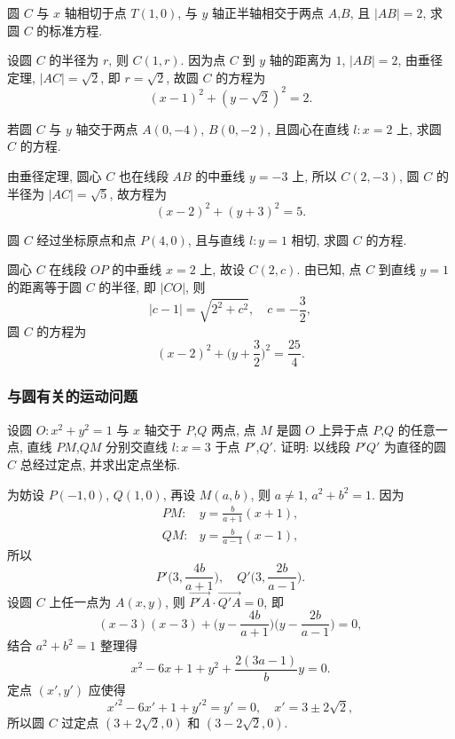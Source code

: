 \begin{example}
    圆 $C$ 与 $x$ 轴相切于点 $T(1,0)$, 与 $y$ 轴正半轴相交于两点 $A$,$B$, 且 $|AB|=2$, 求圆 $C$ 的标准方程.
\end{example}
\beginsolution
    设圆 $C$ 的半径为 $r$, 则 $C(1,r)$. 因为点 $C$ 到 $y$ 轴的距离为 $1$, $|AB|=2$, 由垂径定理, $|AC|= \sqrt2$, 即 $r=\sqrt2$, 故圆 $C$ 的方程为
    \[(x-1)^2+ (y-\sqrt2)^2= 2.\]
\endsolution

\lianxi
\begin{exercise}
    若圆 $C$ 与 $y$ 轴交于两点 $A(0, -4)$, $B(0,-2)$, 且圆心在直线 $l\colon x=2$ 上, 求圆 $C$ 的方程. 
\end{exercise}
\beginsolution
    由垂径定理, 圆心 $C$ 也在线段 $AB$ 的中垂线 $y=-3$ 上, 所以 $C(2,-3)$, 圆 $C$ 的半径为 $|AC|=\sqrt5$, 故方程为
    \[(x-2)^2+(y+3)^2= 5.\]
\endsolution

\begin{exercise}
    圆 $C$ 经过坐标原点和点 $P(4,0)$, 且与直线 $l\colon y=1$ 相切, 求圆 $C$ 的方程.
\end{exercise}
\beginsolution
    圆心 $C$ 在线段 $OP$ 的中垂线 $x=2$ 上, 故设 $C(2,c)$. 由已知, 点 $C$ 到直线 $y=1$ 的距离等于圆 $C$ 的半径, 即 $|CO|$, 则
    \[|c-1|= \sqrt{2^2+c^2},\quad c=-\frac32,\]
    圆 $C$ 的方程为
    \[(x-2)^2+ \biggl(y+\frac32\biggr)^2= \frac{25}4.\]
\endsolution

\subsubsection{与圆有关的运动问题}
\begin{example}
    设圆 $O\colon x^2 +y^2 =1$ 与 $x$ 轴交于 $P$,$Q$ 两点, 点 $M$ 是圆 $O$ 上异于点 $P$,$Q$ 的任意一点, 直线 $PM$,$QM$ 分别交直线 $l\colon x=3$ 于点 $P'$,$Q'$. 证明: 以线段 $P'Q'$ 为直径的圆 $C$ 总经过定点, 并求出定点坐标.
\end{example}
\beginsolution
    为妨设 $P(-1,0)$, $Q(1,0)$, 再设 $M(a,b)$, 则 $a\neq 1$, $a^2+b^2= 1$. 因为
    \[\begin{aligned}
        PM\colon &y= \frac{b}{a+1}(x+1),\\
        QM\colon &y= \frac{b}{a-1}(x-1),
    \end{aligned}\]
    所以
    \[P'\biggl(3,\frac{4b}{a+1}\biggr),\quad
    Q'\biggl(3,\frac{2b}{a-1}\biggr).\]
    设圆 $C$ 上任一点为 $A(x,y)$, 则 $\overrightarrow{P'A}\cdot \overrightarrow{Q'A}=0$, 即
    \[(x-3)(x-3)+ \biggl(y-\frac{4b}{a+1}\biggr)\biggl(y-\frac{2b}{a-1}\biggr)=0,\]
    结合 $a^2+b^2=1$ 整理得
    \[x^2-6x+1+ y^2+ \frac{2(3a-1)}{b}y=0.\]
    定点 $(x',y')$ 应使得
    \[x'^2-6x'+1+ y'^2= y'= 0,\quad x'= 3\pm 2\sqrt2,\]
    所以圆 $C$ 过定点 $(3+ 2\sqrt2,0)$ 和 $(3- 2\sqrt2,0)$.
\endsolution

